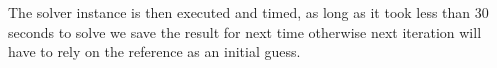The solver instance is then executed and timed, as long as it took less than 30 seconds to solve we save the result for next time
otherwise next iteration will have to rely on the reference as an initial guess.






\newpage